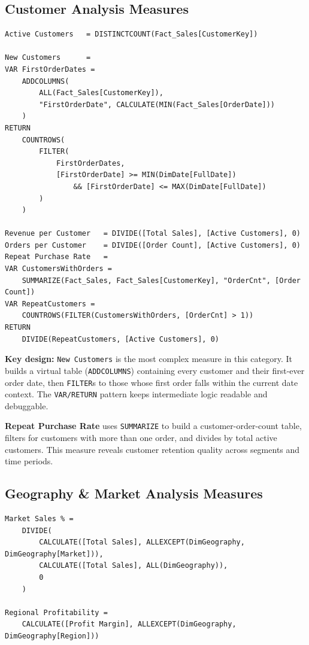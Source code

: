 \documentclass[11pt,a4paper]{article}
\begin{document}
\subsection{Customer Analysis Measures}

\begin{lstlisting}
Active Customers   = DISTINCTCOUNT(Fact_Sales[CustomerKey])

New Customers      =
VAR FirstOrderDates =
    ADDCOLUMNS(
        ALL(Fact_Sales[CustomerKey]),
        "FirstOrderDate", CALCULATE(MIN(Fact_Sales[OrderDate]))
    )
RETURN
    COUNTROWS(
        FILTER(
            FirstOrderDates,
            [FirstOrderDate] >= MIN(DimDate[FullDate])
                && [FirstOrderDate] <= MAX(DimDate[FullDate])
        )
    )

Revenue per Customer   = DIVIDE([Total Sales], [Active Customers], 0)
Orders per Customer    = DIVIDE([Order Count], [Active Customers], 0)
Repeat Purchase Rate   =
VAR CustomersWithOrders =
    SUMMARIZE(Fact_Sales, Fact_Sales[CustomerKey], "OrderCnt", [Order Count])
VAR RepeatCustomers =
    COUNTROWS(FILTER(CustomersWithOrders, [OrderCnt] > 1))
RETURN
    DIVIDE(RepeatCustomers, [Active Customers], 0)
\end{lstlisting}

\textbf{Key design:} \texttt{New Customers} is the most complex measure in this category. It builds a virtual table (\texttt{ADDCOLUMNS}) containing every customer and their first-ever order date, then \texttt{FILTER}s to those whose first order falls within the current date context. The \texttt{VAR/RETURN} pattern keeps intermediate logic readable and debuggable.

\textbf{Repeat Purchase Rate} uses \texttt{SUMMARIZE} to build a customer-order-count table, filters for customers with more than one order, and divides by total active customers. This measure reveals customer retention quality across segments and time periods.

\subsection{Geography \& Market Analysis Measures}

\begin{lstlisting}
Market Sales % =
    DIVIDE(
        CALCULATE([Total Sales], ALLEXCEPT(DimGeography, DimGeography[Market])),
        CALCULATE([Total Sales], ALL(DimGeography)),
        0
    )

Regional Profitability =
    CALCULATE([Profit Margin], ALLEXCEPT(DimGeography, DimGeography[Region]))
\end{lstlisting}
\end{document}
